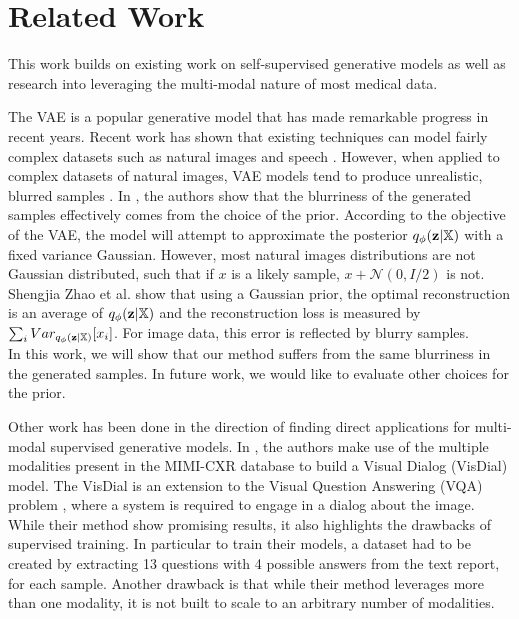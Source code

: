 \section{Related Work}


This work builds on existing work on self-supervised generative models as well as research into leveraging the multi-modal nature of most medical data.

The VAE is a popular generative model that has made remarkable progress in recent years.
Recent work has shown that existing techniques can model fairly complex datasets such as natural images and speech \cite{kingma2015variational, gulrajani2016pixelvae, bowman2015generating}.
However, when applied to complex datasets of natural images, VAE models tend to produce unrealistic, blurred samples \cite{zhao2017towards, dosovitskiy2016generating}.
In \cite{zhao2017towards}, the authors show that the blurriness of the generated samples effectively comes from the choice of the prior.
According to the objective of the VAE, the model will attempt to approximate the posterior $q_{\phi}(\textbf{z}|\mathbb{X})$ with a fixed variance Gaussian.
However, most natural images distributions are not Gaussian distributed, such that if $x$ is a likely sample, $x + \mathcal{N}(0, I/2)$ is not.
Shengjia Zhao et al. \cite{zhao2017towards} show that using a Gaussian prior, the optimal reconstruction is an average of $q_{\phi}(\textbf{z}|\mathbb{X})$ and the reconstruction loss is measured by $\sum _i Var _{q_{\phi}(\textbf{z}|\mathbb{X})} [x_i]$.
For image data, this error is reflected by blurry samples.\\
In this work, we will show that our method suffers from the same blurriness in the generated samples.
In future work, we would like to evaluate other choices for the prior.

Other work has been done in the direction of finding direct applications for multi-modal supervised generative models.
In \cite{kovaleva2020towards}, the authors make use of the multiple modalities present in the MIMI-CXR database \cite{johnson2019mimic} to build a Visual Dialog (VisDial) \cite{das2017visual} model.
The VisDial is an extension to the Visual Question Answering (VQA) problem \cite{antol2015vqa}, where a system is required to engage in a dialog about the image.
While their method show promising results, it also highlights the drawbacks of supervised training.
In particular to train their models, a dataset had to be created by extracting 13 questions with 4 possible answers from the text report, for each sample.
Another drawback is that while their method leverages more than one modality, it is not built to scale to an arbitrary number of modalities.
